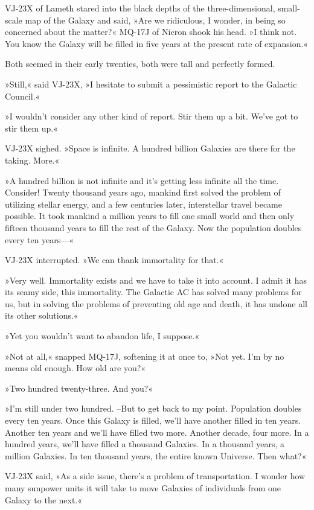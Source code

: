 \documentclass[11pt,twocolumn,paper=a5,pagesize]{article}
\newcommand{\q}[1]{»#1«}
\newcommand{\futuretwo}[1]{ #1 }
\newcommand{\initial}[1]{ \lettrine[lines=3,lhang=0.3,nindent=0em]{  {\textsf{#1}}}{}}
\begin{document}
\futuretwo{
\initial{V}J-23X of Lameth stared into the black depths of the 
three-dimensional, small-scale map of the Galaxy and said, \q{Are we 
ridiculous, I wonder, in being so concerned about the matter?}
MQ-17J of Nicron shook his head. \q{I think not. You know the Galaxy 
will be filled in five years at the present rate of expansion.}

Both seemed in their early twenties, both were tall and perfectly formed.

\q{Still,} said VJ-23X, \q{I hesitate to submit a pessimistic report to the 
Galactic Council.}

\q{I wouldn't consider any other kind of report. Stir them up a bit. We've 
got to stir them up.}

VJ-23X sighed. \q{Space is infinite. A hundred billion Galaxies are there 
for the taking. More.}

\q{A hundred billion is not infinite and it's getting less infinite all the 
time. Consider! Twenty thousand years ago, mankind first solved the problem 
of utilizing stellar energy, and a few centuries later, interstellar travel 
became possible. It took mankind a million years to fill one small world and 
then only fifteen thousand years to fill the rest of the Galaxy. Now the 
population doubles every ten years---}

VJ-23X interrupted. \q{We can thank immortality for that.}

\q{Very well. Immortality exists and we have to take it into account. I admit 
it has its seamy side, this immortality. The Galactic AC has solved many 
problems for us, but in solving the problems of preventing old age and death, 
it has undone all its other solutions.}

\q{Yet you wouldn't want to abandon life, I suppose.}

\q{Not at all,} snapped MQ-17J, softening it at once to, \q{Not yet. I'm by 
no means old enough. How old are you?}

\q{Two hundred twenty-three. And you?}

\q{I'm still under two hundred. --But to get back to my point. Population 
doubles every ten years. Once this Galaxy is filled, we'll have another 
filled in ten years. Another ten years and we'll have filled two more. 
Another decade, four more. In a hundred years, we'll have filled a thousand
Galaxies. In a thousand years, a million Galaxies. In ten thousand years, 
the entire known Universe. Then what?}

VJ-23X said, \q{As a side issue, there's a problem of transportation. I 
wonder how many sunpower units it will take to move Galaxies of individuals 
from one Galaxy to the next.}

}
\end{document}

